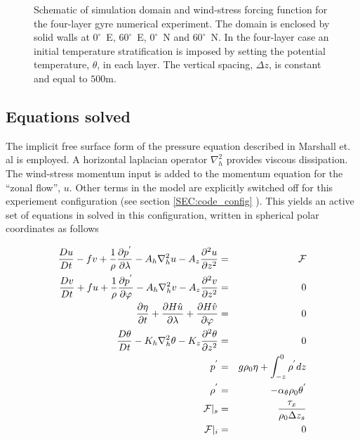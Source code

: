 \begin{figure}
\begin{center}
\end{center}
\caption{Schematic of simulation domain and wind-stress forcing function 
for the four-layer gyre numerical experiment. The domain is enclosed by solid
walls at $0^{\circ}$~E, $60^{\circ}$~E, $0^{\circ}$~N and $60^{\circ}$~N.
In the four-layer case an initial temperature stratification is 
imposed by setting the potential temperature, $\theta$, in each layer.
The vertical spacing, $\Delta z$, is constant and equal to $500$m.
}
\label{FIG:simulation_config}
\end{figure}

\subsection{Equations solved}

The implicit free surface form of the 
pressure equation described in Marshall et. al \cite{Marshall97a} is 
employed. 
A horizontal laplacian operator $\nabla_{h}^2$ provides viscous
dissipation. The wind-stress momentum input is added to the momentum equation
for the ``zonal flow'', $u$. Other terms in the model
are explicitly switched off for this experiement configuration (see section
\ref{SEC:code_config} ). This yields an active set of equations in 
solved in this configuration, written in spherical polar coordinates as 
follows

\begin{eqnarray}
\label{EQ:model_equations}
\frac{Du}{Dt} - fv + 
  \frac{1}{\rho}\frac{\partial p^{'}}{\partial \lambda} - 
  A_{h}\nabla_{h}^2u - A_{z}\frac{\partial^{2}u}{\partial z^{2}} 
& = &
\cal{F}
\\
\frac{Dv}{Dt} + fu + 
  \frac{1}{\rho}\frac{\partial p^{'}}{\partial \varphi} - 
  A_{h}\nabla_{h}^2v - A_{z}\frac{\partial^{2}v}{\partial z^{2}} 
& = &
0
\\
\frac{\partial \eta}{\partial t} + \frac{\partial H \hat{u}}{\partial \lambda} +
\frac{\partial H \hat{v}}{\partial \varphi}
&=&
0
\\
\frac{D\theta}{Dt} -
 K_{h}\nabla_{h}^2\theta  - K_{z}\frac{\partial^{2}\theta}{\partial z^{2}} 
& = &
0
\\
p^{'} & = &
g\rho_{0} \eta + \int^{0}_{-z}\rho^{'} dz
\\
\rho^{'} & = &- \alpha_{\theta}\rho_{0}\theta^{'}
\\
{\cal F} |_{s} & = & \frac{\tau_{x}}{\rho_{0}\Delta z_{s}}
\\
{\cal F} |_{i} & = & 0
\end{eqnarray}

